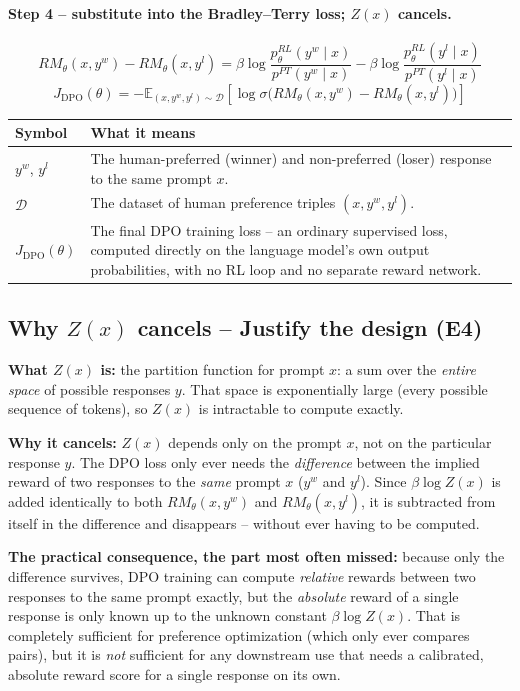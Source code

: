 \documentclass[11pt]{article}
\begin{document}
\paragraph{Step 4 -- substitute into the Bradley--Terry loss; $Z(x)$ cancels.}
\[
RM_\theta(x,y^w) - RM_\theta(x,y^l) = \beta \log \frac{p^{RL}_\theta(y^w \mid
x)}{p^{PT}(y^w \mid x)} - \beta \log \frac{p^{RL}_\theta(y^l \mid x)}{p^{PT}(y^l
\mid x)}
\]
\[
J_{\text{DPO}}(\theta) = -\mathbb{E}_{(x,y^w,y^l)\sim\mathcal{D}}\left[\log
\sigma\Big(RM_\theta(x,y^w) - RM_\theta(x,y^l)\Big)\right]
\]

\begin{center}
\begin{longtable}{|>{\raggedright\arraybackslash}p{3.2cm}|>{\raggedright\arraybackslash}p{10.3cm}|}
\hline
\textbf{Symbol} & \textbf{What it means} \\
\hline
$y^w$, $y^l$ & The human-preferred (winner) and non-preferred (loser) response to
the same prompt $x$. \\
\hline
$\mathcal{D}$ & The dataset of human preference triples $(x, y^w, y^l)$. \\
\hline
$J_{\text{DPO}}(\theta)$ & The final DPO training loss -- an ordinary supervised
loss, computed directly on the language model's own output probabilities, with no
RL loop and no separate reward network. \\
\hline
\end{longtable}
\end{center}

\subsection{Why $Z(x)$ cancels -- Justify the design (E4)}
\textbf{What $Z(x)$ is:} the partition function for prompt $x$: a sum over the
\emph{entire space} of possible responses $y$. That space is exponentially large
(every possible sequence of tokens), so $Z(x)$ is intractable to compute exactly.

\textbf{Why it cancels:} $Z(x)$ depends only on the prompt $x$, not on the
particular response $y$. The DPO loss only ever needs the \emph{difference}
between the implied reward of two responses to the \emph{same} prompt $x$
($y^w$ and $y^l$). Since $\beta\log Z(x)$ is added identically to both
$RM_\theta(x,y^w)$ and $RM_\theta(x,y^l)$, it is subtracted from itself in the
difference and disappears -- without ever having to be computed.

\textbf{The practical consequence, the part most often missed:} because only the
difference survives, DPO training can compute \emph{relative} rewards between two
responses to the same prompt exactly, but the \emph{absolute} reward of a single
response is only known up to the unknown constant $\beta \log Z(x)$. That is
completely sufficient for preference optimization (which only ever compares
pairs), but it is \emph{not} sufficient for any downstream use that needs a
calibrated, absolute reward score for a single response on its own.
\end{document}
